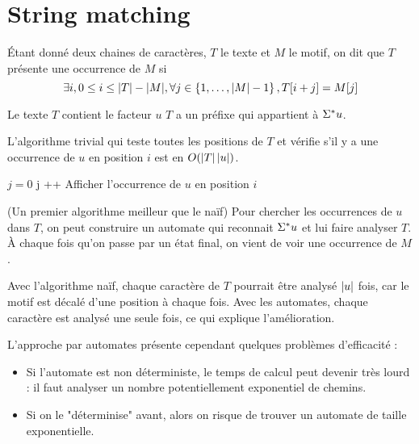 \section{String matching}

\begin{definition}
	Étant donné deux chaines de caractères, $T$ le texte et $M$ le motif, on dit que $T$ présente une occurrence de $M$ si
	$$ \exists i, 0 \leq i \leq |T| - |M|, \forall j \in \left\{1,\ldots,|M| -1\right\}, T[i + j] = M[j]$$
\end{definition}

\begin{remarque}
	Le texte $T$ contient le facteur $u$ \ssi $T$ a un préfixe qui appartient à $\Sigma^{*} u$.
\end{remarque}

\begin{remarque}
	L'algorithme trivial qui teste toutes les positions de $T$ et vérifie s'il y a une occurrence de $u$ en position $i$ est en $O(\left|T\right| \left|u\right|)$.

	\begin{algorithmic}[lines]
		\State $j = 0$
		\State j ++
		\EndWhile
		\State Afficher l'occurrence de $u$ en position $i$
		\EndIf
		\EndFor
		\EndFunction
	\end{algorithmic}
\end{remarque}

\begin{remarque}(Un premier algorithme meilleur que le naïf)
	Pour chercher les occurrences de $u$ dans $T$, on peut construire un automate qui reconnait $\Sigma^{*} u$ et lui faire analyser $T$.
	À chaque fois qu'on passe par un état final, on vient de voir une occurrence de $M$.
\end{remarque}

\begin{remarque}
	Avec l'algorithme naïf, chaque caractère de $T$ pourrait être analysé $\left|u\right|$ fois, car le motif est décalé d'une position à chaque fois.
	Avec les automates, chaque caractère est analysé une seule fois, ce qui explique l'amélioration.
\end{remarque}

\begin{remarque}
	L'approche par automates présente cependant quelques problèmes d'efficacité :
	\begin{itemize}
		\item Si l'automate est non déterministe, le temps de calcul peut devenir très lourd : il faut analyser un nombre potentiellement exponentiel de chemins.
		\item Si on le "déterminise" avant, alors on risque de trouver un automate de taille exponentielle.
	\end{itemize}
\end{remarque}

